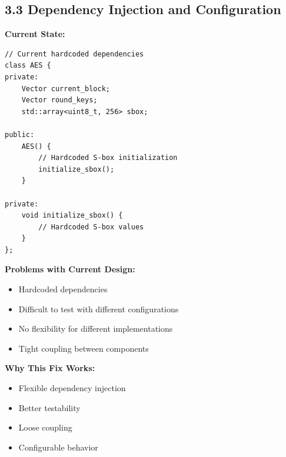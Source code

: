 \documentclass[11pt,a4paper]{article}
\begin{document}
\subsection{3.3 Dependency Injection and Configuration}

\textbf{Current State:}
\begin{lstlisting}
// Current hardcoded dependencies
class AES {
private:
    Vector current_block;
    Vector round_keys;
    std::array<uint8_t, 256> sbox;
    
public:
    AES() {
        // Hardcoded S-box initialization
        initialize_sbox();
    }
    
private:
    void initialize_sbox() {
        // Hardcoded S-box values
    }
};
\end{lstlisting}

\textcolor{problemred}{\textbf{Problems with Current Design:}}
\begin{itemize}
    \item Hardcoded dependencies
    \item Difficult to test with different configurations
    \item No flexibility for different implementations
    \item Tight coupling between components
\end{itemize}

\textcolor{solutiongreen}{\textbf{Why This Fix Works:}}
\begin{itemize}
    \item Flexible dependency injection
    \item Better testability
    \item Loose coupling
    \item Configurable behavior
\end{itemize}
\end{document}
